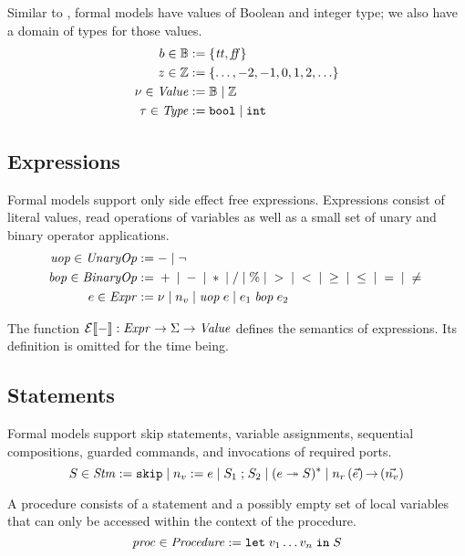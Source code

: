 \documentclass[a4paper,10pt,english]{article}
\begin{document}
Similar to \Fil, formal models have values of Boolean and integer type; we also have a domain of types
for those values.
\begin{align*}
    b \in \mathbb{B} &:= \{ \mathit{tt}, \mathit{ff} \}
    \\
    z \in \mathbb{Z} &:= \{ \ldots, -2, -1, 0, 1, 2, \ldots \}
    \\
    \nu \in \mathit{Value} &:= \mathbb{B} \mid \mathbb{Z}
    \\
	\tau \in \mathit{Type} &:= \mathtt{bool} \mid \mathtt{int}
\end{align*}

\subsection{Expressions}

Formal models support only side effect free expressions. Expressions consist of literal values, read operations of variables
as well as a small set of unary and binary operator applications.
\begin{align*}
	\mathit{uop} \in \mathit{UnaryOp} & := - \mid \neg
	\\
    \mathit{bop} \in \mathit{BinaryOp} & := {} + {} \mid {} - {} \mid {} \ast {} \mid {} / {}
                       \mid {} \% {} \mid {} > {} \mid {} < {} \mid {} \geq {} 
                       \mid {} \leq {} \mid {} = {} \mid {} \neq {}
	\\
	e \in \mathit{Expr} & := 
		\nu \mid
		n_v \mid 
		\mathit{uop}\; e \mid
		e_1 \;\mathit{bop}\; e_2
\end{align*}

The function $\mathcal{E} \llbracket - \rrbracket : \mathit{Expr} \rightarrow \Sigma \rightarrow \mathit{Value}$ defines the semantics of
expressions.
Its definition is omitted for the time being.

\subsection{Statements}

Formal models support skip statements, variable assignments, sequential compositions, guarded commands, and
invocations of required ports.
\begin{equation*}
	S \in \mathit{Stm} :=
		\mathtt{skip} \mid 
		n_v\; \mathtt{:=}\; e \mid
		S_1 \; \mathtt{;} \; S_2 \mid
		(e \; \mathtt{\twoheadrightarrow} \; S)^* \mid
		n_r \left( \vec{e} \right) \mathtt{\rightarrow} \left( \vec{n_v} \right)
\end{equation*}

A procedure consists of a statement and a possibly empty set of local variables that can only be accessed within the context
of the procedure.
\begin{equation*}
	\mathit{proc} \in \mathit{Procedure} := \mathtt{let} \; v_1 \ldots v_n \; \mathtt{in} \; S
\end{equation*}
\end{document}
